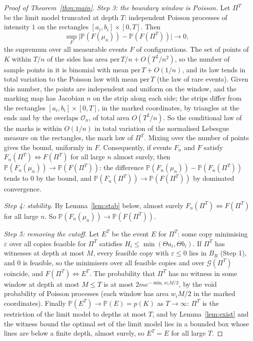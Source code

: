 \documentclass[11pt]{amsart}
\theoremstyle{remark}\newtheorem{remark}[theorem]{Remark}
\newcommand{\Prob}{\mathbb{P}}
\begin{document}
\begin{proof}[Proof of Theorem~\ref{thm:main}]
\emph{Step 3: the boundary window is Poisson.} Let $\Pi^T$ be the limit model truncated at depth $T$: independent
Poisson processes of intensity $1$ on the rectangles $[a_i,b_i]\times[0,T]$. Then
\[
\sup_F\big|\Prob(F(\mu_n))-\Prob(F(\Pi^T))\big|\to0,
\]
the supremum over all measurable events $F$ of configurations. The set of points of $K$ within $T/n$ of the sides has
area $\mathrm{per}\,T/n+O(T^2/n^2)$, so the number of sample points in it is binomial with mean
$\mathrm{per}\,T+O(1/n)$, and its law tends in total variation to the Poisson law with mean $\mathrm{per}\,T$ (the law
of rare events). Given this number, the points are independent and uniform on the window, and the marking map has
Jacobian $n$ on the strip along each side; the strips differ from the rectangles $[a_i,b_i]\times[0,T]$, in the marked
coordinates, by triangles at the ends and by the overlaps $\mathcal O_n$, of total area $O(T^2/n)$. So the conditional
law of the marks is within $O(1/n)$ in total variation of the normalised Lebesgue measure on the rectangles, the mark
law of $\Pi^T$. Mixing over the number of points gives the bound, uniformly in $F$. Consequently, if events $F_n$ and
$F$ satisfy $F_n(\Pi^T)\Leftrightarrow F(\Pi^T)$ for all large $n$ almost surely, then
$\Prob(F_n(\mu_n))\to\Prob(F(\Pi^T))$: the difference $\Prob(F_n(\mu_n))-\Prob(F_n(\Pi^T))$ tends to $0$ by the bound,
and $\Prob(F_n(\Pi^T))\to\Prob(F(\Pi^T))$ by dominated convergence.

\emph{Step 4: stability.} By Lemma~\ref{lem:stab} below, almost surely $F_n(\Pi^T)\Leftrightarrow F(\Pi^T)$ for all
large $n$. So $\Prob(F_n(\mu_n))\to\Prob(F(\Pi^T))$.

\emph{Step 5: removing the cutoff.} Let $E^T$ be the event $E$ for $\Pi^T$: some copy minimising $\varepsilon$ over all
copies feasible for $\Pi^T$ satisfies $H_i\le\min(\Theta a_i,\Theta b_i)$. If $\Pi^T$ has witnesses at depth at most
$M$, every feasible copy with $\varepsilon\le0$ lies in $B_R$ (Step 1), and $0$ is feasible, so the minimisers over all
feasible copies and over $\mathcal G(\Pi^T)$ coincide, and $F(\Pi^T)\Leftrightarrow E^T$. The probability that $\Pi^T$
has no witness in some window at depth at most $M\le T$ is at most $2me^{-\min_iw_iM/2}$, by the void probability of
Poisson processes (each window has area $w_iM/2$ in the marked coordinates). Finally $\Prob(E^T)\to\Prob(E)=p(K)$ as $T\to\infty$: $\Pi^T$ is the restriction of the limit model
to depths at most $T$, and by Lemma~\ref{lem:exist} and the witness bound the optimal set of the limit model lies in a
bounded box whose lines are below a finite depth, almost surely, so $E^T=E$ for all large $T$.


\end{proof}
\end{document}
